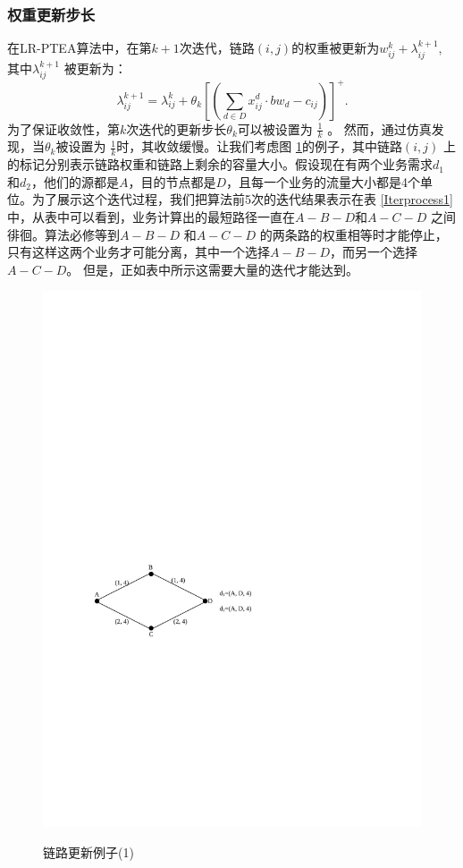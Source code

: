 \subsubsection{权重更新步长}
在LR-PTEA算法中，在第$k+1$次迭代，链路$(i,j)$的权重被更新为$w_{ij}^{k} + \lambda_{ij}^{k+1}$, 其中$\lambda_{ij}^{k+1}$ 被更新为：
\begin{equation}\label{Iter}
\lambda_{ij}^{k+1} = \lambda_{ij}^k + \theta_k[(\sum\limits_{d \in D}x_{ij}^d \cdot bw_d - c_{ij})]^+.
\end{equation}
为了保证收敛性，第$k$次迭代的更新步长$\theta_k$可以被设置为 $\frac{1}{k}$ 。 然而，通过仿真发现，当$\theta_k$被设置为 $\frac{1}{k}$时，其收敛缓慢。让我们考虑图 \ref{u1}的例子，其中链路$(i,j)$ 上的标记分别表示链路权重和链路上剩余的容量大小。假设现在有两个业务需求$d_1$ 和$d_2$，他们的源都是$A$，目的节点都是$D$，且每一个业务的流量大小都是4个单位。为了展示这个迭代过程，我们把算法前5次的迭代结果表示在表 \ref{Iterprocess1}中，从表中可以看到，业务计算出的最短路径一直在$A-B-D$和$A-C-D$ 之间徘徊。算法必修等到$A-B-D$ 和$A-C-D$ 的两条路的权重相等时才能停止，只有这样这两个业务才可能分离，其中一个选择$A-B-D$，而另一个选择$A-C-D$。 但是，正如表中所示这需要大量的迭代才能达到。
\begin{figure}
\setlength{\abovecaptionskip}{-0.5cm}
\begin{center}
{\includegraphics[width=0.4 \textwidth]{figures/IterNum.pdf}}
\end{center}
\caption{{\footnotesize{链路更新例子(1)}}}
\label{u1}
\end{figure}
